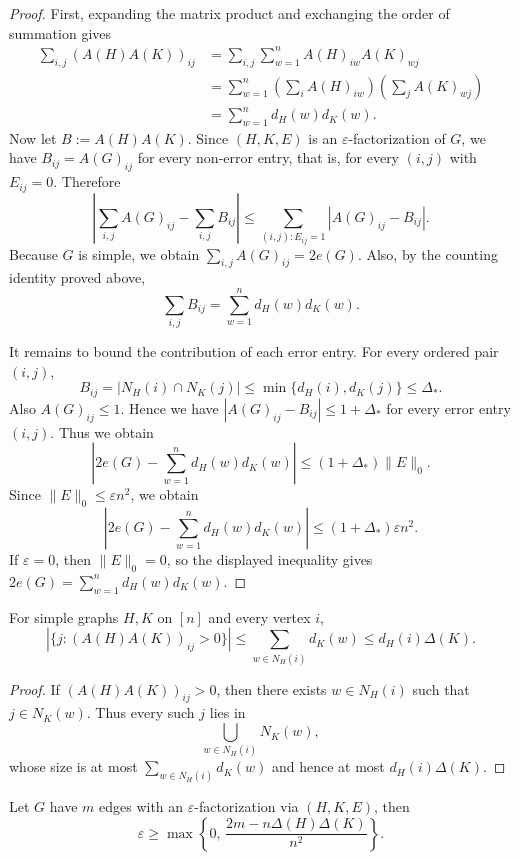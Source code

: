 \documentclass{file}
\newcommand{\eps}{\varepsilon}
\begin{document}
\begin{proof}
First, expanding the matrix product and exchanging the order of summation gives
\[
\begin{aligned}
\sum_{i,j}(A(H)A(K))_{ij}
&=
\sum_{i,j}\sum_{w=1}^n A(H)_{iw}A(K)_{wj}  \\
&=
\sum_{w=1}^n
\left(\sum_i A(H)_{iw}\right)
\left(\sum_j A(K)_{wj}\right)  \\
&=
\sum_{w=1}^n d_H(w)d_K(w).
\end{aligned}
\]
Now let $B:=A(H)A(K)$.
Since $(H,K,E)$ is an $\eps$-factorization of $G$, we have
$B_{ij}=A(G)_{ij}$ for every non-error entry, that is, for every $(i,j)$ with $E_{ij}=0$.
Therefore
\[
  \left|
  \sum_{i,j}A(G)_{ij}-\sum_{i,j}B_{ij}
  \right|
  \le
  \sum_{(i,j):E_{ij}=1}|A(G)_{ij}-B_{ij}|.
\]
Because $G$ is simple, we obtain $\sum_{i,j}A(G)_{ij}=2e(G)$.
Also, by the counting identity proved above,
\[
  \sum_{i,j}B_{ij}
  =
  \sum_{w=1}^n d_H(w)d_K(w).
\]

It remains to bound the contribution of each error entry.  For every ordered pair $(i,j)$,
\[
  B_{ij}
  =
  |N_H(i)\cap N_K(j)|
  \le
  \min\{d_H(i),d_K(j)\}
  \le
  \Delta_*.
\]
Also $A(G)_{ij}\le 1$.  
Hence we have $|A(G)_{ij}-B_{ij}|\le 1+\Delta_*$
for every error entry $(i,j)$.  
Thus we obtain
\[
  \left|
  2e(G)-\sum_{w=1}^n d_H(w)d_K(w)
  \right|
  \le
  (1+\Delta_*)\|E\|_0.
\]
Since $\|E\|_0\le \eps n^2$, we obtain
\[
  \left|
  2e(G)-\sum_{w=1}^n d_H(w)d_K(w)
  \right|
  \le
  (1+\Delta_*)\eps n^2.
\]
If $\eps=0$, then $\|E\|_0=0$, so the displayed inequality gives $2e(G)=\sum_{w=1}^n d_H(w)d_K(w)$.
\end{proof}

\begin{lem}
\label{lem:row-support}
For simple graphs $H,K$ on $[n]$ and every vertex $i$,
\[
  |\{j:(A(H)A(K))_{ij}>0\}|
  \le
  \sum_{w\in N_H(i)}d_K(w)
  \le
  d_H(i)\Delta(K).
\]
\end{lem}

\begin{proof}
If $(A(H)A(K))_{ij}>0$, then there exists $w\in N_H(i)$ such that
$j\in N_K(w)$.  Thus every such $j$ lies in
\[
  \bigcup_{w\in N_H(i)}N_K(w),
\]
whose size is at most $\sum_{w\in N_H(i)}d_K(w)$ and hence at most
$d_H(i)\Delta(K)$.
\end{proof}

\begin{thm}
\label{thm:degree-tradeoff}
Let $G$ have $m$ edges with an $\eps$-factorization via
$(H,K,E)$, then
\[
  \eps
  \ge
  \max\left\{
  0,\,
  \frac{2m-n\Delta(H)\Delta(K)}{n^2}
  \right\}.
\]
\end{thm}
\end{document}

